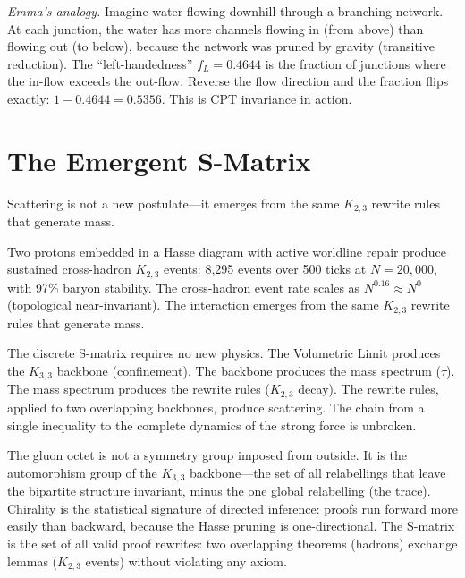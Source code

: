 \documentclass[11pt, a4paper, openany]{book}
\newcounter{thm}[chapter]
\begin{document}
\noindent
\textit{Emma's analogy.}
Imagine water flowing downhill through a branching network. At each
junction, the water has more channels flowing in (from above) than
flowing out (to below), because the network was pruned by gravity
(transitive reduction). The ``left-handedness'' $f_L = 0.4644$ is the
fraction of junctions where the in-flow exceeds the out-flow. Reverse
the flow direction and the fraction flips exactly: $1 - 0.4644 = 0.5356$.
This is CPT invariance in action.

\section{The Emergent S-Matrix}\label{sec:emergent-smatrix}

Scattering is not a new postulate---it emerges from the same $K_{2,3}$
rewrite rules that generate mass.

\begin{theorem}\label{thm:emergent-scattering}
Two protons embedded in a Hasse diagram with active worldline repair
produce sustained cross-hadron $K_{2,3}$ events: 8{,}295 events over
500 ticks at $N = 20{,}000$, with 97\% baryon stability. The cross-hadron
event rate scales as $N^{0.16} \approx N^0$ (topological
near-invariant). The interaction emerges from the same $K_{2,3}$
rewrite rules that generate mass.

The discrete S-matrix requires no new physics. The Volumetric
Limit produces the $K_{3,3}$ backbone (confinement). The backbone
produces the mass spectrum ($\tau$). The mass spectrum produces the
rewrite rules ($K_{2,3}$ decay). The rewrite rules, applied to two
overlapping backbones, produce scattering. The chain from a single
inequality to the complete dynamics of the strong force is unbroken.
\end{theorem}

\begin{logicalreading}
The gluon octet is not a symmetry group imposed from outside. It is
the automorphism group of the $K_{3,3}$ backbone---the set of all
relabellings that leave the bipartite structure invariant, minus the
one global relabelling (the trace). Chirality is the statistical
signature of directed inference: proofs run forward more easily than
backward, because the Hasse pruning is one-directional. The S-matrix
is the set of all valid proof rewrites: two overlapping theorems
(hadrons) exchange lemmas ($K_{2,3}$ events) without violating any
axiom.
\end{logicalreading}
\end{document}
